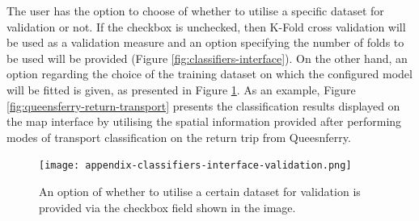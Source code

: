 \documentclass[bsc,frontabs,twoside,singlespacing, parskip,deptreport]{infthesis}     %
\begin{document}
\begin{appendices}
The user has the option to choose of whether to utilise a specific dataset for validation or not. If the checkbox is unchecked, then K-Fold cross validation will be used as a validation measure and an option specifying the number of folds to be used will be provided (Figure \ref{fig:classifiers-interface}). On the other hand, an option regarding the choice of the training dataset on which the configured model will be fitted is given, as presented in Figure \ref{fig:validation-checkbox}. As an example, Figure \ref{fig:queensferry-return-transport} presents the classification results displayed on the map interface by utilising the spatial information provided after performing modes of transport classification on the return trip from Queesnferry.

\begin{figure}[h!]
  \center
  \texttt{[image: appendix-classifiers-interface-validation.png]}
  \caption{An option of whether to utilise a certain dataset for validation is provided via the checkbox field shown in the image.}
  \label{fig:validation-checkbox}
\end{figure}

\end{appendices}
\end{document}
